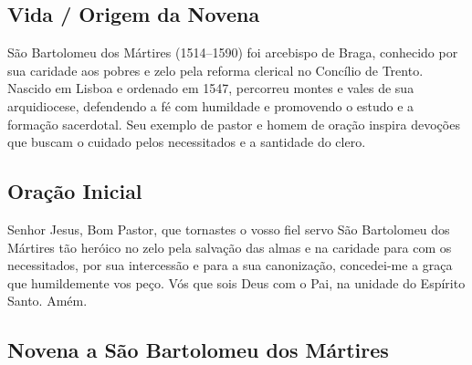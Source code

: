 \documentclass[18pt]{article}
\author{Adaptado de publicação revisada}
\date{} %
\begin{document}
\tableofcontents
\thispagestyle{empty}

\newpage
\begin{center}
  \section*{Vida / Origem da Novena}
\end{center}
\begin{justify}
São Bartolomeu dos Mártires (1514–1590) foi arcebispo de Braga, conhecido por sua caridade aos pobres e zelo pela reforma clerical no Concílio de Trento. Nascido em Lisboa e ordenado em 1547, percorreu montes e vales de sua arquidiocese, defendendo a fé com humildade e promovendo o estudo e a formação sacerdotal. Seu exemplo de pastor e homem de oração inspira devoções que buscam o cuidado pelos necessitados e a santidade do clero.
\end{justify}

\newpage
\begin{center}
  \section*{Oração Inicial}
\end{center}
\begin{justify}
Senhor Jesus, Bom Pastor, que tornastes o vosso fiel servo São Bartolomeu dos Mártires tão heróico no zelo pela salvação das almas e na caridade para com os necessitados, por sua intercessão e para a sua canonização, concedei-me a graça que humildemente vos peço. Vós que sois Deus com o Pai, na unidade do Espírito Santo. Amém.
\end{justify}

\newpage
\begin{center}
  \section*{Novena a São Bartolomeu dos Mártires}
\end{center}

\end{document}
